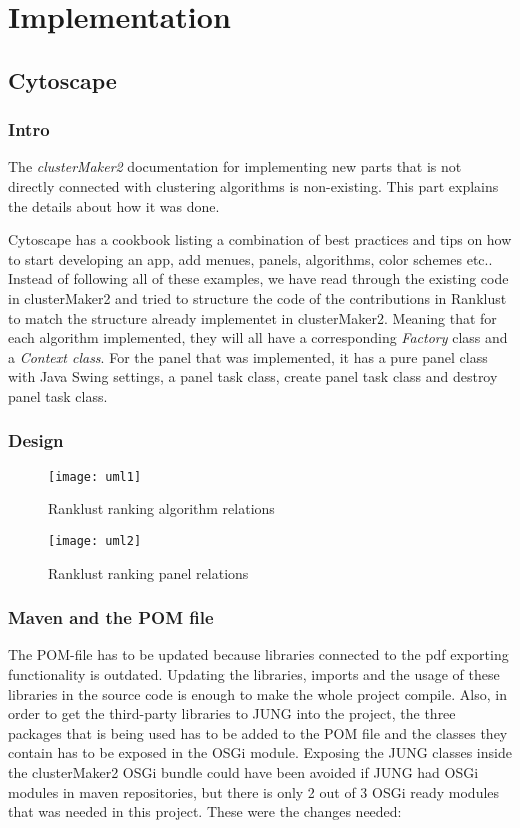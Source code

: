 \part{Implementation}
\label{pa:implementation}
\chapter{Cytoscape}
\section{Intro}
The \textit{clusterMaker2} documentation for implementing new parts that is not
directly connected with clustering algorithms is non-existing. This part
explains the details about how it was done.

Cytoscape has a cookbook\cite{cytoscape-cookbook} listing a combination of best
practices and tips on how to start developing an app, add menues, panels,
algorithms, color schemes etc.. Instead of following all of these examples, we
have read through the existing code in clusterMaker2\cite{cm2-github} and tried
to structure the code of the contributions in Ranklust to match the structure
already implementet in clusterMaker2. Meaning that for each algorithm
implemented, they will all have a corresponding \textit{Factory} class and a
\textit{Context class}. For the panel that was implemented, it has a pure panel
class with Java Swing\cite{java-swing} settings, a panel task class, create
panel task class and destroy panel task class. %

\section{Design}
\begin{figure}[ht]
    \caption{Ranklust ranking algorithm relations}
    \texttt{[image: uml1]}
\end{figure}

\begin{figure}[ht]
    \caption{Ranklust ranking panel relations}
    \texttt{[image: uml2]}
\end{figure}

\section{Maven and the POM file}
The POM-file has to be updated because libraries connected to the pdf exporting
functionality is outdated. Updating the libraries, imports and the usage of
these libraries in the source code is enough to make the whole project compile.
Also, in order to get the third-party libraries to JUNG\cite{jung} into the
project, the three packages that is being used has to be added to the POM file
and the classes they contain has to be exposed in the OSGi
module\cite{osgi-felix}. Exposing the JUNG classes inside the clusterMaker2 OSGi
bundle could have been avoided if JUNG had OSGi modules in maven repositories,
but there is only 2 out of 3 OSGi ready modules that was needed in this project.
These were the changes needed:

